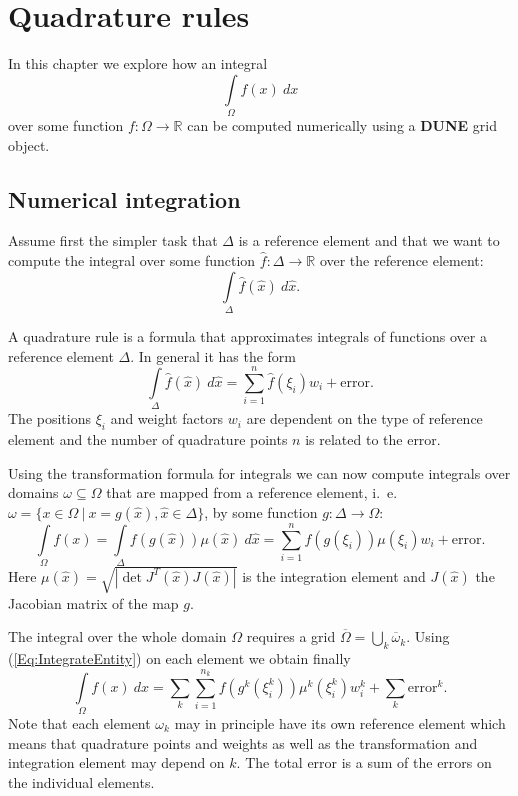 \documentclass[11pt,a4paper,headinclude,footinclude,DIV16,normalheadings]{scrreprt}
\newcommand{\Dune}{{\sf\bfseries DUNE}}
\begin{document}



\chapter{Quadrature rules}

In this chapter we explore how an integral $$\int\limits_{\Omega} f(x)\ dx$$
over some function $f:\Omega\to\mathbb{R}$ can be computed numerically
using a \Dune{} grid object.

\section{Numerical integration}

Assume first the simpler task that $\Delta$ is a reference element 
and that we want to
compute the integral over some function $\hat{f}:\Delta\to\mathbb{R}$
over the reference element:$$\int\limits_{\Delta} \hat{f}(\hat{x})\ d\hat{x}.$$


A quadrature rule is a formula that approximates integrals of
functions over a reference element $\Delta$. In general it has the form
$$\int\limits_{\Delta} \hat{f}(\hat{x})\ d\hat{x} = \sum_{i=1}^n
\hat{f}(\xi_i) w_i + \text{error}.$$
The positions $\xi_i$ and weight factors $w_i$ are dependent on the
type of reference element and the number of quadrature points $n$ is
related to the error.

Using the transformation formula for integrals we can now compute
integrals over domains $\omega\subseteq\Omega$ that are mapped from a
reference element, i.~e.~$\omega=\{x\in\Omega\ |\
x=g(\hat{x}), \hat{x}\in\Delta\}$, by some function $g:\Delta\to\Omega$:
\begin{equation}
\int\limits_{\Omega} f(x) = \int\limits_{\Delta} f(g(\hat{x}))\mu(\hat{x})\
d\hat{x} = \sum_{i=1}^n f(g(\xi_i))\mu(\xi_i)w_i + \text{error}. 
\label{Eq:IntegrateEntity}
\end{equation}
Here $\mu(\hat{x}) = \sqrt{|\det J^T(\hat{x})J(\hat{x})|}$ is the
integration element and $J(\hat{x})$ the Jacobian matrix of the map $g$.

The integral over the whole domain $\Omega$ requires a grid
$\overline{\Omega}=\bigcup_k \overline{\omega}_k$. Using
(\ref{Eq:IntegrateEntity}) on each element we obtain finally
\begin{equation}
\int\limits_{\Omega} f(x)\ dx = \sum\limits_{k} \sum_{i=1}^{n_k}
f(g^k(\xi^k_i))\mu^k(\xi^k_i)w^k_i + \sum\limits_{k} \text{error}^k.
\label{Eq:IntegrateDomain}
\end{equation}
Note that each element $\omega_k$ may in principle have its own
reference element which means that quadrature points and weights as
well as the transformation and integration element may depend on
$k$. The total error is a sum of the errors on the individual
elements. 
\end{document}
